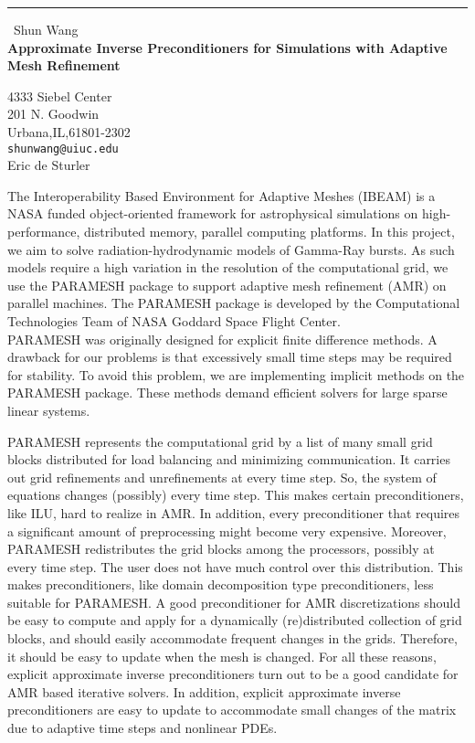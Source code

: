 \documentclass{report}
\begin{document}
\begin{center}
\rule{6in}{1pt} \
{\large Shun Wang \\
{\bf Approximate Inverse Preconditioners for Simulations with Adaptive Mesh Refinement}}

4333 Siebel Center \\ 201 N. Goodwin \\ Urbana,IL,61801-2302
\\
{\tt shunwang@uiuc.edu}\\
Eric de Sturler\end{center}

The Interoperability Based Environment for Adaptive Meshes (IBEAM) is
a NASA funded object-oriented framework for astrophysical
simulations on high-performance, distributed memory, parallel
computing platforms. In this project, we aim to solve
radiation-hydrodynamic models of Gamma-Ray bursts. As such
models require a high variation in the resolution of the computational grid,
we use the PARAMESH package to support adaptive mesh refinement (AMR) on
parallel machines. The PARAMESH package is developed by the Computational Technologies
Team of NASA Goddard Space Flight Center.\\

PARAMESH was originally designed for explicit finite difference
methods. A drawback for our problems is that excessively small
time steps may be required for stability. To avoid this
problem, we are implementing implicit methods on the PARAMESH package.
These methods demand efficient solvers for large sparse
linear systems.

PARAMESH represents the computational grid by a list of many small grid
blocks distributed for load balancing and minimizing communication. It carries out
grid refinements and unrefinements at every time step. So, the system of
equations changes (possibly) every time step. This makes certain preconditioners, like
ILU, hard to realize in AMR. In addition, every preconditioner that requires
a significant amount of preprocessing might become very expensive.
Moreover, PARAMESH redistributes the grid blocks among the processors, possibly
at every time step. The user does not have much control over this
distribution. This makes preconditioners, like domain
decomposition type preconditioners, less suitable for PARAMESH.
A good preconditioner for AMR discretizations
should be easy to compute and apply for a dynamically (re)distributed collection
of grid blocks, and should easily accommodate frequent changes in the grids.
Therefore, it should be easy to update when the mesh is changed. For all these
reasons, explicit approximate inverse preconditioners turn out to be a good
candidate for AMR based iterative solvers. In addition, explicit approximate
inverse preconditioners are easy to update to accommodate small changes of
the matrix due to adaptive time steps and nonlinear PDEs.\\
\end{document}
